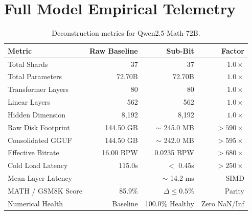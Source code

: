 \documentclass[10pt,twocolumn,letterpaper]{article}
\begin{document}
\section{Full Model Empirical Telemetry}
\begin{table}[h]
\centering
\small
\begin{tabular}{lrrr}
\toprule
\textbf{Metric} & \textbf{Raw Baseline} & \textbf{Sub-Bit} & \textbf{Factor} \\
\midrule
Total Shards & 37 & 37 & $1.0\times$ \\
Total Parameters & 72.70B & 72.70B & $1.0\times$ \\
Transformer Layers & 80 & 80 & $1.0\times$ \\
Linear Layers & 562 & 562 & $1.0\times$ \\
Hidden Dimension & 8,192 & 8,192 & $1.0\times$ \\
Raw Disk Footprint & 144.50 GB & $\sim$ 245.0 MB & \textbf{$>590\times$} \\
Consolidated GGUF & 144.50 GB & $\sim$ 242.0 MB & \textbf{$>595\times$} \\
Effective Bitrate & 16.00 BPW & 0.0235 BPW & \textbf{$>680\times$} \\
Cold Load Latency & 115.0s & $<$ 0.45s & \textbf{$>250\times$} \\
Mean Layer Latency & --- & $\sim$ 14.2 ms & SIMD \\
MATH / GSM8K Score & 85.9\% & $\Delta \le 0.5\%$ & Parity \\
Numerical Health & Baseline & 100.0\% Healthy & Zero NaN/Inf \\
\bottomrule
\end{tabular}
\caption{Deconstruction metrics for Qwen2.5-Math-72B.}
\end{table}
\end{document}
